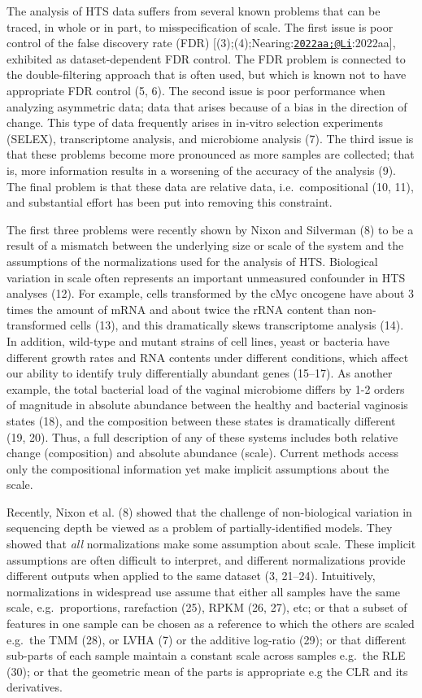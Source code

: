 \documentclass[
]{article}
\begin{document}
The analysis of HTS data suffers from several known problems that can be
traced, in whole or in part, to misspecification of scale. The first
issue is poor control of the false discovery rate (FDR)
{[}(3);(4);Nearing:\href{mailto:2022aa;@Li}{\nolinkurl{2022aa;@Li}}:2022aa{]},
exhibited as dataset-dependent FDR control. The FDR problem is connected
to the double-filtering approach that is often used, but which is known
not to have appropriate FDR control (5, 6). The second issue is poor
performance when analyzing asymmetric data; data that arises because of
a bias in the direction of change. This type of data frequently arises
in in-vitro selection experiments (SELEX), transcriptome analysis, and
microbiome analysis (7). The third issue is that these problems become
more pronounced as more samples are collected; that is, more information
results in a worsening of the accuracy of the analysis (9). The final
problem is that these data are relative data, i.e.~compositional (10,
11), and substantial effort has been put into removing this constraint.

The first three problems were recently shown by Nixon and Silverman (8)
to be a result of a mismatch between the underlying size or scale of the
system and the assumptions of the normalizations used for the analysis
of HTS. Biological variation in scale often represents an important
unmeasured confounder in HTS analyses (12). For example, cells
transformed by the cMyc oncogene have about 3 times the amount of mRNA
and about twice the rRNA content than non-transformed cells (13), and
this dramatically skews transcriptome analysis (14). In addition,
wild-type and mutant strains of cell lines, yeast or bacteria have
different growth rates and RNA contents under different conditions,
which affect our ability to identify truly differentially abundant genes
(15--17). As another example, the total bacterial load of the vaginal
microbiome differs by 1-2 orders of magnitude in absolute abundance
between the healthy and bacterial vaginosis states (18), and the
composition between these states is dramatically different (19, 20).
Thus, a full description of any of these systems includes both relative
change (composition) and absolute abundance (scale). Current methods
access only the compositional information yet make implicit assumptions
about the scale.

Recently, Nixon et al. (8) showed that the challenge of non-biological
variation in sequencing depth be viewed as a problem of
partially-identified models. They showed that \emph{all} normalizations
make some assumption about scale. These implicit assumptions are often
difficult to interpret, and different normalizations provide different
outputs when applied to the same dataset (3, 21--24). Intuitively,
normalizations in widespread use assume that either all samples have the
same scale, e.g.~proportions, rarefaction (25), RPKM (26, 27), etc; or
that a subset of features in one sample can be chosen as a reference to
which the others are scaled e.g.~the TMM (28), or LVHA (7) or the
additive log-ratio (29); or that different sub-parts of each sample
maintain a constant scale across samples e.g.~the RLE (30); or that the
geometric mean of the parts is appropriate e.g the CLR and its
derivatives.
\end{document}
